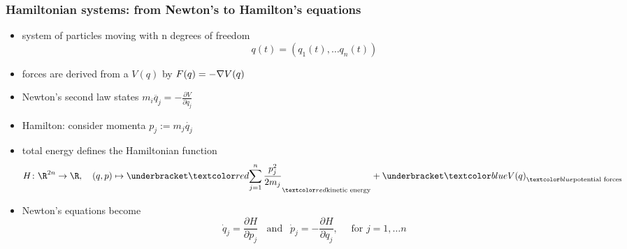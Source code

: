 
\begin{frame}
  \frametitle{Hamiltonian systems: from Newton's to Hamilton's equations}
  \begin{itemize}
    \item system of particles moving with n degrees of freedom %
    \[ q(t) = (q_1(t),\dots q_n(t)) \]
    \item {}
    forces are derived from a  $V(q)$ by $F(q)= -\nabla V(q)$
    \item Newton's second law states $m_i \ddot{q_j} = - \frac{\partial V}{\partial q_j}$
    \pause

    \item Hamilton: consider momenta $p_j := m_j \dot{q_j}$
    \item total energy defines the Hamiltonian function
    \[ H\colon \R^{2n}\to\R,\quad (q,p)\mapsto \mymark{red}{\sum_{j=1}^n \frac{p_j^2}{2 m_j}}{kinetic energy} + \mymark{blue}{V(q)}{potential forces} \]
    \vspace{-\baselineskip}
    \item Newton's equations become 
    \begin{equation*} \dot{q}_j = \frac{\partial H}{\partial p_j} \;\;\text{ and }\;\,\dot{p}_j = -\frac{\partial H}{\partial q_j}, \quad \text{ for }j=1,\dots n \tag{H}\end{equation*}
  \end{itemize}
\end{frame}

